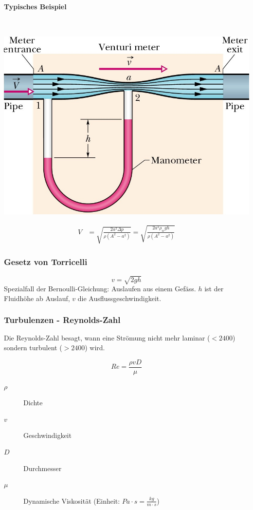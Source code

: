 \documentclass[a4paper]{scrartcl}
\begin{document}
	\paragraph{Typisches Beispiel} \hfill \\
	\begin{multicols}{2}[]
		\includegraphics[width=\linewidth]{img/bernoulli}
		
		\begin{align*}
			V &= \sqrt{\frac{2a^2 \Delta p}{\rho (A^2 - a^2)}} = \sqrt{\frac{2 a^2 \rho_w g h}{\rho (A^2 - a^2)}}
		\end{align*}
	\end{multicols}


\subsubsection{Gesetz von Torricelli}
	\[
		v = \sqrt{2gh}
	\]
	Spezialfall der Bernoulli-Gleichung: Auslaufen aus einem Gefäss. $h$ ist der Fluidhöhe ab Auslauf, $v$ die Ausflussgeschwindigkeit.
	

\subsubsection{Turbulenzen - Reynolds-Zahl}
	Die Reynolds-Zahl besagt, wann eine Strömung nicht mehr laminar ($<2400$) sondern turbulent ($>2400$) wird.
	
	\[
		Re = \frac{\rho v D}{\mu}
	\]

	\begin{description}
		\item[$\rho$] Dichte
		\item[$v$] Geschwindigkeit
		\item[$D$] Durchmesser
		\item[$\mu$] Dynamische Viskosität (Einheit: $Pa \cdot s = \frac{kg}{m \cdot s}$)
	\end{description}
\end{document}
